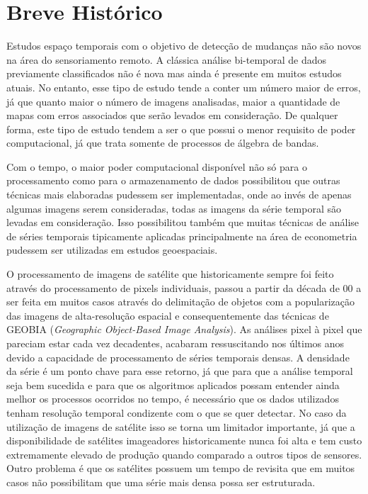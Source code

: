 \documentclass[twocolumn]{article}
\begin{document}
\section{Breve Histórico}

Estudos espaço temporais com o objetivo de detecção de mudanças não são novos na área do sensoriamento remoto. A clássica análise bi-temporal de dados previamente classificados não é nova mas ainda é presente em muitos estudos atuais. No entanto, esse tipo de estudo tende a conter um número maior de erros, já que quanto maior o número de imagens analisadas, maior a quantidade de mapas com erros associados que serão levados em consideração. De qualquer forma, este tipo de estudo tendem a ser o que possui o menor requisito de poder computacional, já que trata somente de processos de álgebra de bandas.
\par
Com o tempo, o maior poder computacional disponível não só para o processamento como para o armazenamento de dados possibilitou que outras técnicas mais elaboradas pudessem ser implementadas, onde ao invés de apenas algumas imagens serem consideradas, todas as imagens da série temporal são levadas em consideração. Isso possibilitou também que muitas técnicas de análise de séries temporais tipicamente aplicadas principalmente na área de econometria pudessem ser utilizadas em estudos geoespaciais.
\par
O processamento de imagens de satélite que historicamente sempre foi feito através do processamento de pixels individuais, passou a partir da década de 00 a ser feita em muitos casos através do delimitação de objetos com a popularização das imagens de alta-resolução espacial e consequentemente das técnicas de GEOBIA (\textit{Geographic Object-Based Image Analysis}). As análises pixel à pixel que pareciam estar cada vez decadentes, acabaram ressuscitando nos últimos anos devido a capacidade de processamento de séries temporais densas. A densidade da série é um ponto chave para esse retorno, já que para que a análise temporal seja bem sucedida e para que os algoritmos aplicados possam entender ainda melhor os processos ocorridos no tempo, é necessário que os dados utilizados tenham resolução temporal condizente com o que se quer detectar. No caso da utilização de imagens de satélite isso se torna um limitador importante, já que a disponibilidade de satélites imageadores historicamente nunca foi alta e tem custo extremamente elevado de produção quando comparado a outros tipos de sensores. Outro problema é que os satélites possuem um tempo de revisita que em muitos casos não possibilitam que uma série mais densa possa ser estruturada. 
\end{document}
